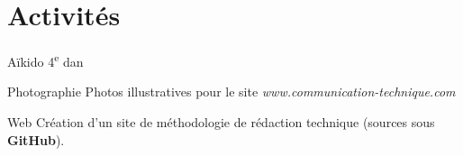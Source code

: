 \documentclass[11pt,a4paper,roman]{moderncv}
\begin{document}


\section{Activités}

\cvitem
    {Aïkido}
    {4\textsuperscript{e} dan}

\cvitem
    {Photographie}
    {Photos illustratives pour le site \textit{www.communication-technique.com}}

\cvitem
    {Web}
    {Création d'un site de méthodologie de rédaction technique (sources sous
      \textbf{GitHub}).}
\end{document}
